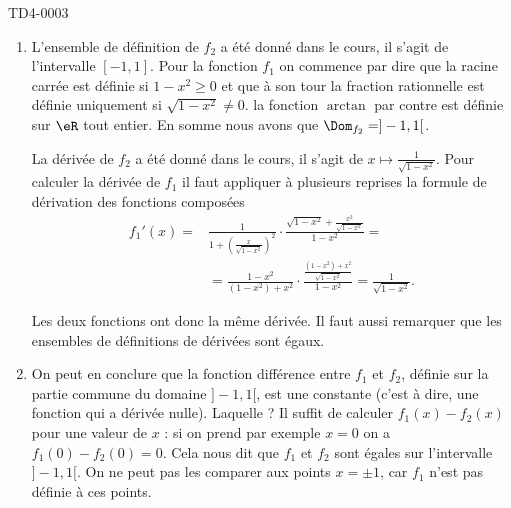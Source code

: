 

\begin{corrige}{TD4-0003}

  \begin{enumerate}
  \item L'ensemble de définition de $f_2$ a été donné dans le cours, il s'agit de l'intervalle $[-1,1]$. Pour la fonction $f_1$ on commence par dire que la racine carrée est définie si $1-x^2 \geq 0$ et que à son tour la fraction rationnelle est définie uniquement si $\sqrt{1-x^2}\neq 0$. la fonction $\arctan$ par contre est définie sur $\eR$ tout entier. En somme nous avons que $\Dom_{f_2} = ]-1,1[$.

La dérivée de  $f_2$ a été donné dans le cours, il s'agit de $\displaystyle x\mapsto \frac{1}{\sqrt{1-x^2}}$. Pour calculer la dérivée de $f_1$ il faut appliquer à plusieurs reprises la formule de dérivation des fonctions composées
\begin{equation*}
  \begin{aligned}
    f_1' (x) = &\frac{1}{1+\left(\frac{x}{\sqrt{1-x^2}}\right)^2} \cdot \frac{\sqrt{1-x^2} + \frac{x^2}{\sqrt{1-x^2}}}{1-x^2} = \\
    &= \frac{1-x^2}{(1-x^2) +x^2}\cdot\frac{\frac{(1-x^2) +x^2}{\sqrt{1-x^2}}}{1-x^2} =\frac{1}{\sqrt{1-x^2}}.
  \end{aligned}
\end{equation*}

Les deux fonctions ont donc la m\^eme dérivée. Il faut aussi remarquer que les ensembles de définitions de dérivées sont égaux. 
  \item On peut en conclure que la fonction différence entre $f_1$ et $f_2$, définie sur la partie commune du domaine $]-1,1[$,  est une constante (c'est à dire, une fonction qui a dérivée nulle). Laquelle ? Il suffit de calculer $f_1(x)-f_2(x)$ pour une valeur de $x$ : si on prend par exemple $x =0$ on a $f_1(0) -f_2(0) =0$. Cela nous dit que $f_1$ et $f_2$ sont égales sur l'intervalle $]-1,1[$. On ne peut pas les comparer aux points $x = \pm 1$, car $f_1$ n'est pas définie à ces points.
  \end{enumerate}
\end{corrige}
